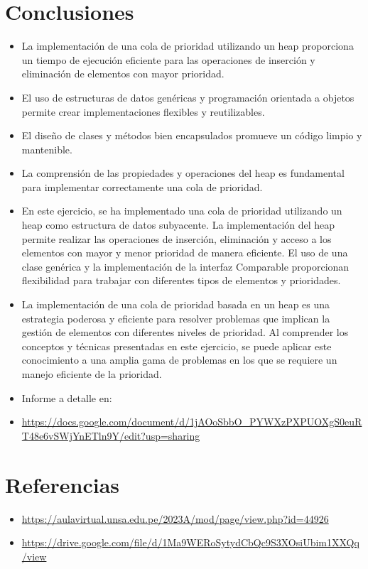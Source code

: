 \documentclass{article}
\begin{document}
	\section{Conclusiones}
	\begin{itemize}
		\item La implementación de una cola de prioridad utilizando un heap proporciona un tiempo de ejecución eficiente para las operaciones de inserción y eliminación de elementos con mayor prioridad.
		\item El uso de estructuras de datos genéricas y programación orientada a objetos permite crear implementaciones flexibles y reutilizables.
		\item El diseño de clases y métodos bien encapsulados promueve un código limpio y mantenible.
		\item La comprensión de las propiedades y operaciones del heap es fundamental para implementar correctamente una cola de prioridad.
		\item En este ejercicio, se ha implementado una cola de prioridad utilizando un heap como estructura de datos subyacente. La implementación del heap permite realizar las operaciones de inserción, eliminación y acceso a los elementos con mayor y menor prioridad de manera eficiente. El uso de una clase genérica y la implementación de la interfaz Comparable proporcionan flexibilidad para trabajar con diferentes tipos de elementos y prioridades.
		\item La implementación de una cola de prioridad basada en un heap es una estrategia poderosa y eficiente para resolver problemas que implican la gestión de elementos con diferentes niveles de prioridad. Al comprender los conceptos y técnicas presentadas en este ejercicio, se puede aplicar este conocimiento a una amplia gama de problemas en los que se requiere un manejo eficiente de la prioridad.
		\item Informe a detalle en: 
		\item \url {https://docs.google.com/document/d/1jAOoSbbO_PYWXzPXPUOXgS0euRT48e6vSWjYnETln9Y/edit?usp=sharing}

	\end{itemize}
	\section{Referencias}
	\begin{itemize}
		\item \url{https://aulavirtual.unsa.edu.pe/2023A/mod/page/view.php?id=44926}			
		\item \url{https://drive.google.com/file/d/1Ma9WERoSytydCbQc9S3XOsiUbim1XXQq/view}
	\end{itemize}	
	
\end{document}
